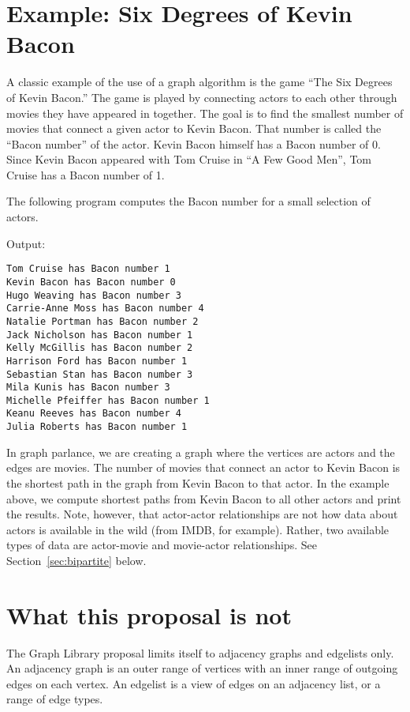 \section{Example: Six Degrees of Kevin Bacon}
\label{sec:bacon}

A classic example of the use of a graph algorithm is the game ``The Six Degrees of Kevin Bacon.''
The game is played by connecting actors to each other through movies they have appeared in together.
The goal is to find the smallest number of movies that connect a given actor to Kevin Bacon.
That number is called the ``Bacon number'' of the actor. Kevin Bacon himself has a Bacon number of 0.
Since Kevin Bacon appeared with Tom Cruise in ``A Few Good Men'', Tom Cruise has a Bacon number of 1.

The following program computes the Bacon number for a small selection of actors.

{\small
  
}


\noindent
Output:
\begin{lstlisting}
Tom Cruise has Bacon number 1
Kevin Bacon has Bacon number 0
Hugo Weaving has Bacon number 3
Carrie-Anne Moss has Bacon number 4
Natalie Portman has Bacon number 2
Jack Nicholson has Bacon number 1
Kelly McGillis has Bacon number 2
Harrison Ford has Bacon number 1
Sebastian Stan has Bacon number 3
Mila Kunis has Bacon number 3
Michelle Pfeiffer has Bacon number 1
Keanu Reeves has Bacon number 4
Julia Roberts has Bacon number 1    
\end{lstlisting}  


In graph parlance, we are creating a graph where the vertices are actors and the edges are movies.
The number of movies that connect an actor to Kevin Bacon is the shortest path in the graph
from Kevin Bacon to that actor. In the example above, we compute shortest paths from Kevin
Bacon to all other actors and print the results.
Note, however, that actor-actor relationships are not how data about actors
is available in the wild (from IMDB, for example).  Rather, two available types of data are actor-movie and movie-actor relationships.  See Section~\ref{sec:bipartite} below.

\section{What this proposal is  \textbf{not}}

The Graph Library proposal limits itself to adjacency graphs and edgelists only. An adjacency graph is an outer range of vertices with an inner range of outgoing
edges on each vertex. An edgelist is a view of edges on an adjacency list, or a range of edge types.


